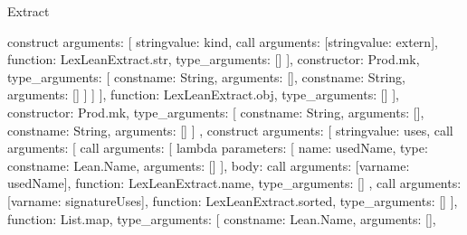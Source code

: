 \begin{lexlean}{Extract}
\begin{toolingmodule}
{{{{{{{{{{                                  construct{
                                    arguments: [
                                      string{value: kind},
                                      call{
                                        arguments: [string{value: extern}],
                                        function: LexLeanExtract.str,
                                        type_arguments: []
                                      }
                                    ],
                                    constructor: Prod.mk,
                                    type_arguments: [
                                      const{name: String, arguments: []},
                                      const{name: String, arguments: []}
                                    ]
                                  }
                                ]
                              }
                            ],
                            function: LexLeanExtract.obj,
                            type_arguments: []
                          }
                        ],
                        constructor: Prod.mk,
                        type_arguments: [
                          const{name: String, arguments: []},
                          const{name: String, arguments: []}
                        ]
                      },
                      construct{
                        arguments: [
                          string{value: uses},
                          call{
                            arguments: [
                              call{
                                arguments: [
                                  lambda{
                                    parameters: [
                                      {name: usedName, type: const{name: Lean.Name, arguments: []}}
                                    ],
                                    body: call{
                                      arguments: [var{name: usedName}],
                                      function: LexLeanExtract.name,
                                      type_arguments: []
                                    }
                                  },
                                  call{
                                    arguments: [var{name: signatureUses}],
                                    function: LexLeanExtract.sorted,
                                    type_arguments: []
                                  }
                                ],
                                function: List.map,
                                type_arguments: [
                                  const{name: Lean.Name, arguments: []},
}}}}}}}}}}
\end{toolingmodule}
\end{lexlean}
